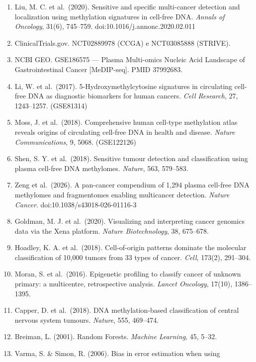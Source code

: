 \documentclass[11pt,a4paper]{article}
\providecommand{\tightlist}{\setlength{\itemsep}{0pt}\setlength{\parskip}{0pt}}
\begin{document}
\begin{enumerate}
\def\labelenumi{\arabic{enumi}.}
\tightlist
\item
  Liu, M. C. et al.~(2020). Sensitive and specific multi-cancer detection and
  localization using methylation signatures in cell-free DNA. \emph{Annals of
  Oncology}, 31(6), 745--759. doi:10.1016/j.annonc.2020.02.011
\item
  ClinicalTrials.gov. NCT02889978 (CCGA) e NCT03085888 (STRIVE).
\item
  NCBI GEO. GSE186575 --- Plasma Multi-omics Nucleic Acid Landscape of
  Gastrointestinal Cancer {[}MeDIP-seq{]}. PMID 37992683.
\item
  Li, W. et al.~(2017). 5-Hydroxymethylcytosine signatures in circulating
  cell-free DNA as diagnostic biomarkers for human cancers. \emph{Cell
  Research}, 27, 1243--1257. (GSE81314)
\item
  Moss, J. et al.~(2018). Comprehensive human cell-type methylation atlas
  reveals origins of circulating cell-free DNA in health and disease.
  \emph{Nature Communications}, 9, 5068. (GSE122126)
\item
  Shen, S. Y. et al.~(2018). Sensitive tumour detection and classification using
  plasma cell-free DNA methylomes. \emph{Nature}, 563, 579--583.
\item
  Zeng et al.~(2026). A pan-cancer compendium of 1,294 plasma cell-free DNA
  methylomes and fragmentomes enabling multicancer detection. \emph{Nature
  Cancer}. doi:10.1038/s43018-026-01116-3
\item
  Goldman, M. J. et al.~(2020). Visualizing and interpreting cancer genomics
  data via the Xena platform. \emph{Nature Biotechnology}, 38, 675--678.
\item
  Hoadley, K. A. et al.~(2018). Cell-of-origin patterns dominate the molecular
  classification of 10,000 tumors from 33 types of cancer. \emph{Cell}, 173(2),
  291--304.
\item
  Moran, S. et al.~(2016). Epigenetic profiling to classify cancer of unknown
  primary: a multicentre, retrospective analysis. \emph{Lancet Oncology},
  17(10), 1386--1395.
\item
  Capper, D. et al.~(2018). DNA methylation-based classification of central
  nervous system tumours. \emph{Nature}, 555, 469--474.
\item
  Breiman, L. (2001). Random Forests. \emph{Machine Learning}, 45, 5--32.
\item
  Varma, S. \& Simon, R. (2006). Bias in error estimation when using

\end{enumerate}
\end{document}
